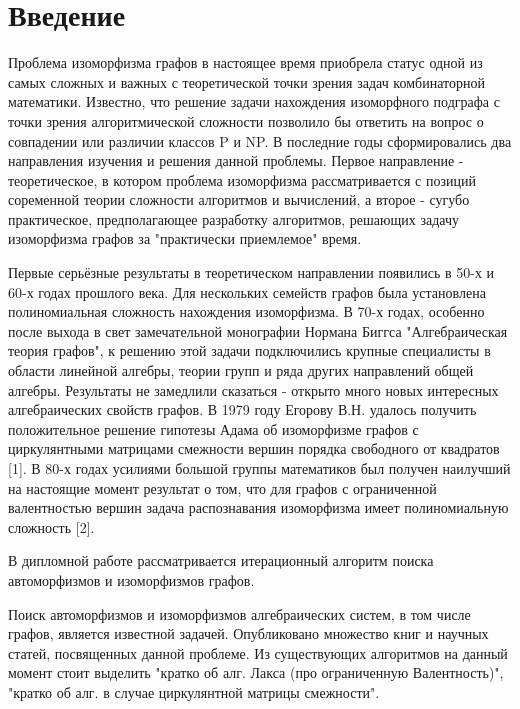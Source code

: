 \section*{Введение}
\label{sec:Introduction} 
\large 

Проблема изоморфизма графов в настоящее время приобрела статус одной из самых сложных и важных с теоретической точки зрения задач комбинаторной математики. Известно, что решение задачи нахождения изоморфного подграфа с точки зрения алгоритмической сложности позволило бы ответить на вопрос о совпадении или различии классов P и NP. В последние годы сформировались два направления изучения и решения данной проблемы. Первое направление - теоретическое, в котором проблема изоморфизма рассматривается с позиций соременной теории сложности алгоритмов и вычислений, а второе - сугубо практическое, предполагающее разработку алгоритмов, решающих задачу изоморфизма графов за "практически приемлемое" время.

Первые серьёзные результаты в теоретическом направлении появились в 50-х и 60-х годах прошлого века. Для нескольких семейств графов была установлена полиномиальная сложность нахождения изоморфизма. В 70-х годах, особенно после выхода в свет замечательной монографии Нормана Биггса "Алгебраическая теория графов", к решению этой задачи подключились крупные специалисты в области линейной алгебры, теории групп и ряда других направлений общей алгебры. Результаты не замедлили сказаться - открыто много новых интересных алгебраических свойств графов. В 1979 году Егорову В.Н. удалось получить положительное решение гипотезы Адама об изоморфизме графов с циркулянтными матрицами смежности вершин порядка свободного от квадратов [1]. В 80-х годах усилиями большой группы математиков был получен наилучший на настоящие момент результат о том, что для графов с ограниченной валентностью вершин задача распознавания изоморфизма имеет полиномиальную сложность [2].




В дипломной работе рассматривается итерационный алгоритм поиска автоморфизмов и изоморфизмов графов.

Поиск автоморфизмов и изоморфизмов алгебраических систем, в том числе графов, является известной задачей. Опубликовано множество книг и научных статей, посвященных данной проблеме. Из существующих алгоритмов на данный момент стоит выделить "кратко об алг. Лакса (про ограниченную Валентность)"{}, "кратко об алг. в случае циркулянтной матрицы смежности"{}.

